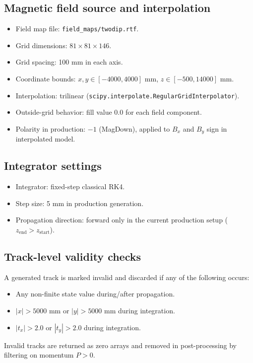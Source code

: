 \documentclass[11pt,a4paper]{article}
\begin{document}
\subsection{Magnetic field source and interpolation}
\begin{itemize}[leftmargin=*]
  \item Field map file: \texttt{field\_maps/twodip.rtf}.
  \item Grid dimensions: $81\times81\times146$.
  \item Grid spacing: 100 mm in each axis.
  \item Coordinate bounds: $x,y\in[-4000,4000]$ mm, $z\in[-500,14000]$ mm.
  \item Interpolation: trilinear (\texttt{scipy.interpolate.RegularGridInterpolator}).
  \item Outside-grid behavior: fill value $0.0$ for each field component.
  \item Polarity in production: $-1$ (MagDown), applied to $B_x$ and $B_y$ sign in interpolated model.
\end{itemize}

\subsection{Integrator settings}
\begin{itemize}[leftmargin=*]
  \item Integrator: fixed-step classical RK4.
  \item Step size: 5 mm in production generation.
  \item Propagation direction: forward only in the current production setup ($z_{\mathrm{end}} > z_{\mathrm{start}}$).
\end{itemize}

\subsection{Track-level validity checks}
A generated track is marked invalid and discarded if any of the following occurs:
\begin{itemize}[leftmargin=*]
  \item Any non-finite state value during/after propagation.
  \item $|x| > 5000$ mm or $|y| > 5000$ mm during integration.
  \item $|t_x| > 2.0$ or $|t_y| > 2.0$ during integration.
\end{itemize}
Invalid tracks are returned as zero arrays and removed in post-processing by filtering on momentum $P>0$.
\end{document}
